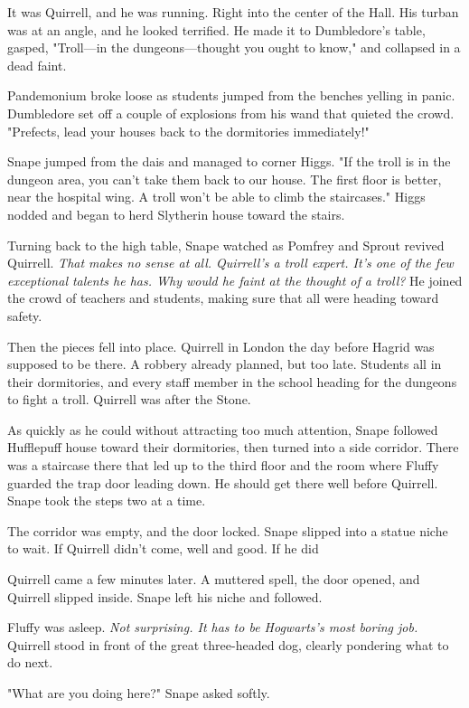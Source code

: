 It was Quirrell, and he was running. Right into the center of the Hall. His turban was at an angle, and he looked terrified. He made it to Dumbledore's table, gasped, "Troll—in the dungeons—thought you ought to know," and collapsed in a dead faint.

Pandemonium broke loose as students jumped from the benches yelling in panic. Dumbledore set off a couple of explosions from his wand that quieted the crowd. "Prefects, lead your houses back to the dormitories immediately!"

Snape jumped from the dais and managed to corner Higgs. "If the troll is in the dungeon area, you can't take them back to our house. The first floor is better, near the hospital wing. A troll won't be able to climb the staircases." Higgs nodded and began to herd Slytherin house toward the stairs.

Turning back to the high table, Snape watched as Pomfrey and Sprout revived Quirrell. \emph{That makes no sense at all. Quirrell's a troll expert. It's one of the few exceptional talents he has. Why would he faint at the thought of a troll?} He joined the crowd of teachers and students, making sure that all were heading toward safety.

Then the pieces fell into place. Quirrell in London the day before Hagrid was supposed to be there. A robbery already planned, but too late. Students all in their dormitories, and every staff member in the school heading for the dungeons to fight a troll. Quirrell was after the Stone.

As quickly as he could without attracting too much attention, Snape followed Hufflepuff house toward their dormitories, then turned into a side corridor. There was a staircase there that led up to the third floor and the room where Fluffy guarded the trap door leading down. He should get there well before Quirrell. Snape took the steps two at a time.

The corridor was empty, and the door locked. Snape slipped into a statue niche to wait. If Quirrell didn't come, well and good. If he did{\el}

Quirrell came a few minutes later. A muttered spell, the door opened, and Quirrell slipped inside. Snape left his niche and followed.

Fluffy was asleep. \emph{Not surprising. It has to be Hogwarts's most boring job.} Quirrell stood in front of the great three-headed dog, clearly pondering what to do next.

"What are you doing here?" Snape asked softly.

